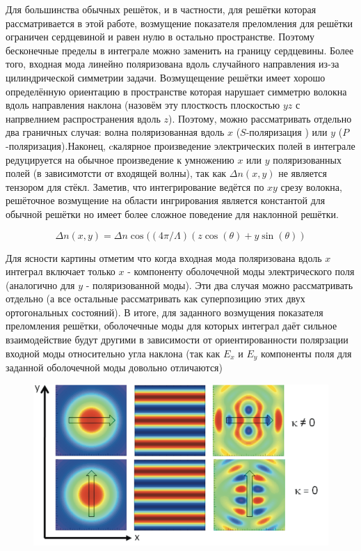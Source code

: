 Для большинства обычных решёток, и в частности, для решётки которая рассматривается в этой работе, возмущение показателя преломления для решётки ограничен сердцевиной и равен нулю в остально пространстве. Поэтому бесконечные пределы в интеграле можно заменить на границу сердцевины.
Более того, входная мода линейно поляризована вдоль случайного направления
из-за цилиндрической симметрии задачи. Возмущещение решётки имеет хорошо определённую ориентацию в пространстве которая нарушает симметрю волокна вдоль направления наклона (назовём эту плосткость плоскостью $yz$  с напрвелнием распространения вдоль $ z $). Поэтому, можно рассматривать отдельно два граничных случая: волна поляризованная вдоль $ x $  ($ S $-поляризация ) или $ y $ ($ P $-поляризация).Наконец, cкалярное произведение электрических полей в интеграле редуцируется на обычное произведение к умножению $ x $ или $ y $ поляризованных полей (в зависимотсти от входящей волны), так как $\Delta n(x , y)$ не является тензором для стёкл. Заметив, что интегрирование ведётся по $ xy $ срезу волокна, решёточное возмущение на области ингрирования является константой для обычной решётки но имеет более сложное поведение для наклонной решётки.

$$\Delta n(x, y)=\Delta n \cos ((4 \pi / \Lambda)(z \cos (\theta)+y \sin (\theta))$$

Для ясности картины отметим что когда входная мода поляризована вдоль $ x $
интеграл включает только $ x $ - компоненту оболочечной моды электрического поля (аналогично для $ y $ - поляризованной моды). Эти два случая можно рассматривать отдельно (а все остальные рассматривать как суперпозицию этих двух ортогональных состояний). В итоге, для заданного возмущения показателя преломления решётки, оболочечные моды для которых интеграл даёт сильное взаимодействие будут другими в зависимости от ориентированности полярзации входной моды относительно угла наклона (так как $ E_x $ и $ E_y $ компоненты поля для заданной оболочечной моды довольно отличаются)
 
\begin{figure}[h]
	\centering
	\includegraphics[width=0.7\linewidth]{screenshot008}
	\caption{}
	\label{fig:screenshot008}
\end{figure}



 